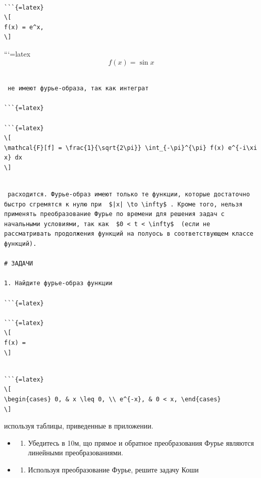 \documentclass[
  ukrainian,
]{article}
\providecommand{\tightlist}{%
  \setlength{\itemsep}{0pt}\setlength{\parskip}{0pt}}
\begin{document}
\begin{verbatim}

```{=latex}
\[
f(x) = e^x,
\]
\end{verbatim}

```{=latex}
\[
f(x) = \sin x
\]

\begin{verbatim}

 не имеют фурье-образа, так как интеграт

```{=latex}

```{=latex}
\[
\mathcal{F}[f] = \frac{1}{\sqrt{2\pi}} \int_{-\pi}^{\pi} f(x) e^{-i\xi x} dx
\]
\end{verbatim}

\begin{verbatim}

 расходится. Фурье-образ имеют только те функции, которые достаточно быстро сгремятся к нулю при  $|x| \to \infty$ . Кроме того, нельзя применять преобразование Фурье по времени для решения задач с начальными условиями, так как  $0 < t < \infty$  (если не рассматривать продолжения функций на полуось в соответствующем классе функций).

# ЗАДАЧИ

1. Найдите фурье-образ функции

```{=latex}

```{=latex}
\[
f(x) =
\]
\end{verbatim}

\begin{verbatim}

```{=latex}
\[
\begin{cases} 0, & x \leq 0, \\ e^{-x}, & 0 < x, \end{cases}
\]
\end{verbatim}

используя таблицы, приведенные в приложении.

\begin{itemize}
\tightlist
\item
  \begin{enumerate}
  \def\labelenumi{\arabic{enumi}.}
  \setcounter{enumi}{1}
  \tightlist
  \item
    Убедитесь в 10м, що прямое и обратное преобразования Фурье являются
    линейными преобразованиями.
  \end{enumerate}
\item
  \begin{enumerate}
  \def\labelenumi{\arabic{enumi}.}
  \setcounter{enumi}{2}
  \tightlist
  \item
    Используя преобразование Фурье, решите задачу Коши
  \end{enumerate}
\end{itemize}
\end{document}
